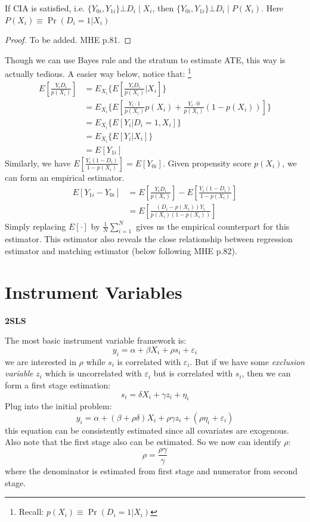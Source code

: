 \begin{thm}
    If CIA is satisfied, i.e. $\{Y_{0i},Y_{1i}\} \bot D_i \mid X_i $, then $\{Y_{0i},Y_{1i}\} \bot D_i \mid P(X_i) $. Here $P(X_i) \equiv \Pr(D_i=1|X_i)$
\end{thm}

\begin{proof}
    To be added. MHE p.81.
\end{proof}

Though we can use Bayes rule and the stratum to estimate ATE, this way is actually tedious. A easier way below, notice that:
\footnote{Recall: $p(X_i)\equiv \Pr(D_i=1|X_i)$}
\begin{align*}
    E[\frac{Y_i D_i}{p(X_i)}] &= E_{X_i}\{E[\frac{Y_i D_i}{p(X_i)} | X_i]\} \\
    &= E_{X_i} \{E[\frac{Y_i\cdot 1}{p(X_i)}p(X_i) + \frac{Y_i\cdot 0}{p(X_i)}(1-p(X_i))]\} \\
    &= E_{X_i}\{E[Y_i | D_i=1,X_i]\} \\
    &= E_{X_i}\{E[Y_i | X_i]\} \\
    &= E[Y_{1i}]
\end{align*}
Similarly, we have $E[\frac{Y_i(1-D_i)}{1-p(X_i)}] = E[Y_{0i}]$. 
Given propensity score $p(X_i)$, we can form an empirical estimator.
\begin{align*}
    E[Y_{1i}-Y_{0i}] &= E[\frac{Y_i D_i}{p(X_i)}] - E[\frac{Y_i(1-D_i)}{1-p(X_i)}]\\
    &= E[
    \frac{(D_i- p(X_i))Y_i}{p(X_i)(1-p(X_i))}
    ]
\end{align*}
Simply replacing $E[\cdot]$ by $\frac{1}{N} \sum_{i=1}^N$ gives us the empirical counterpart for this estimator.
This estimator also reveals the close relationship between regression estimator and matching estimator (below following MHE p.82).


\chapter{Instrument Variables} %
\label{cha:instrument_variables}

\textbf{2SLS}

The most basic instrument variable framework is:
\[
    y_i = \alpha + \beta X_i + \rho s_i + \varepsilon_i
\]
we are interested in $\rho$ while $s_i$ is correlated with $\varepsilon_i$.
But if we have some \textit{exclusion variable} $z_i$ which is uncorrelated with $\varepsilon_i$ but is correlated with $s_i$, then we can form a first stage estimation:
\[
    s_i = \delta X_i + \gamma z_i + \eta_i
\]
Plug into the initial problem:
\[
    y_i = \alpha + (\beta + \rho \delta)X_i + \rho \gamma z_i + (\rho \eta_i + \varepsilon_i)
\]
this equation can be consistently estimated since all covariates are exogenous.
Also note that the first stage also can be estimated. So we now can identify $\rho$:
\[
    \rho = \frac{\rho \gamma}{\gamma}
\]
where the denominator is estimated from first stage and numerator from second stage.

